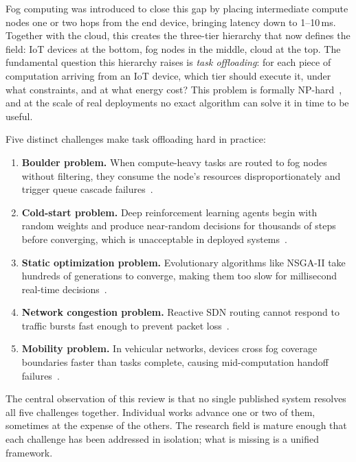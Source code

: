 \documentclass[12pt,a4paper]{article}
\begin{document}
Fog computing was introduced to close this gap by placing intermediate compute
nodes one or two hops from the end device, bringing latency down to 1--10\,ms.
Together with the cloud, this creates the three-tier hierarchy that now defines
the field: IoT devices at the bottom, fog nodes in the middle, cloud at the top.
The fundamental question this hierarchy raises is \emph{task offloading}: for
each piece of computation arriving from an IoT device, which tier should execute
it, under what constraints, and at what energy cost? This problem is formally
NP-hard~\cite{mashal2024drl}, and at the scale of real deployments no exact
algorithm can solve it in time to be useful.

Five distinct challenges make task offloading hard in practice:

\begin{enumerate}[leftmargin=*, label=\textbf{C\arabic*.}]
  \item \textbf{Boulder problem.} When compute-heavy tasks are routed to fog
    nodes without filtering, they consume the node's resources disproportionately
    and trigger queue cascade failures~\cite{nouri2024tof}.

  \item \textbf{Cold-start problem.} Deep reinforcement learning agents begin
    with random weights and produce near-random decisions for thousands of steps
    before converging, which is unacceptable in deployed systems~\cite{vfc_drl2024}.

  \item \textbf{Static optimization problem.} Evolutionary algorithms like
    NSGA-II take hundreds of generations to converge, making them too slow for
    millisecond real-time decisions~\cite{zhu2025dag}.

  \item \textbf{Network congestion problem.} Reactive SDN routing cannot
    respond to traffic bursts fast enough to prevent packet loss~\cite{gasmi2024sdn,csfd2025}.

  \item \textbf{Mobility problem.} In vehicular networks, devices cross fog
    coverage boundaries faster than tasks complete, causing mid-computation
    handoff failures~\cite{paper5_mobility,mavto2024}.
\end{enumerate}

The central observation of this review is that no single published system resolves
all five challenges together. Individual works advance one or two of them, sometimes
at the expense of the others. The research field is mature enough that each
challenge has been addressed in isolation; what is missing is a unified framework.
\end{document}
